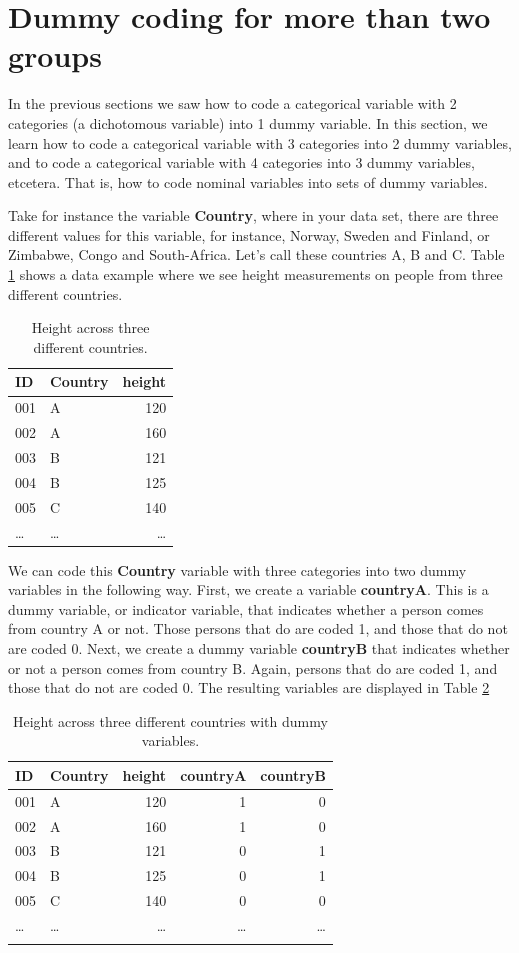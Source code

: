 \documentclass[]{book}\usepackage[]{graphicx}\usepackage[]{color}
\begin{document}
\section{Dummy coding for more than two groups}

In the previous sections we saw how to code a categorical variable with 2 categories (a dichotomous variable) into 1 dummy variable. In this section, we learn how to code a categorical variable with 3 categories into 2 dummy variables, and to code a categorical variable with 4 categories into 3 dummy variables, etcetera. That is, how to code nominal variables into sets of dummy variables.

Take for instance the variable \textbf{Country}, where in your data set, there are three different values for this variable, for instance, Norway, Sweden and Finland, or Zimbabwe, Congo and South-Africa. Let's call these countries A, B and C. Table \ref{tab:countryheight} shows a data example where we see height measurements on people from three different countries.
 
 \begin{table}
 \caption{Height across three different countries.}
 \begin{tabular}{llr}
 ID & Country &  height\\ \hline
  001 &A & 120\\
  002 &A & 160\\
  003 &B & 121\\
  004 &B & 125\\
  005 &C & 140\\
  \dots & \dots & \dots\\
 \end{tabular} 
 \label{tab:countryheight}
 \end{table}


We can code this \textbf{Country} variable with three categories into two dummy variables in the following way. First, we create a variable \textbf{countryA}. This is a dummy variable, or indicator variable, that indicates whether a person comes from country A or not. Those persons that do are coded 1, and those that do not are coded 0. Next, we create a dummy variable \textbf{countryB} that indicates whether or not a person comes from country B. Again, persons that do are coded 1, and those that do not are coded 0. The resulting variables are displayed in Table \ref{tab:dummy}
 
 \begin{table}
 \caption{Height across three different countries with dummy variables.}
 \begin{tabular}{llrrr}
 ID & Country &  height & countryA & countryB \\ \hline
  001 &A & 120 & 1 & 0\\
  002 &A & 160 & 1 & 0\\
  003 &B & 121 & 0 & 1\\
  004 &B & 125 & 0 & 1\\
  005 &C & 140 & 0 & 0\\
  \dots & \dots & \dots& \dots & \dots\\
  \label{tab:dummy}
 \end{tabular}
 \end{table}
\end{document}
